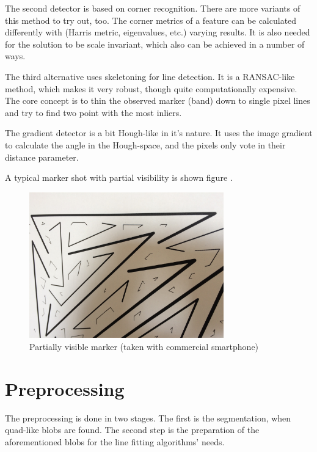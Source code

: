The second detector is based on corner recognition.
There are more variants of this method to try out, too.
The corner metrics of a feature can be calculated differently with (Harris metric, eigenvalues, etc.) varying results.
It is also needed for the solution to be scale invariant, which also can be achieved in a number of ways.

The third alternative uses skeletoning for line detection.
It is a RANSAC-like method, which makes it very robust, though quite computationally expensive.
The core concept is to thin the observed marker (band) down to single pixel lines and try to find two point with the most inliers.

The gradient detector is a bit Hough-like in it's nature.
It uses the image gradient to calculate the angle in the Hough-space, and the pixels only vote in their distance parameter.

A typical marker shot with partial visibility is shown figure .
\begin{figure}[ht]
	\centering
	\includegraphics[width=0.75\textwidth]{figures/t35_01.JPG}
	\caption{Partially visible marker (taken with commercial smartphone)}
	\label{fig:partialMarkerShot}
\end{figure}

\section{Preprocessing}

The preprocessing is done in two stages.
The first is the segmentation, when quad-like blobs are found.
The second step is the preparation of the aforementioned blobs for the line fitting algorithms' needs.

